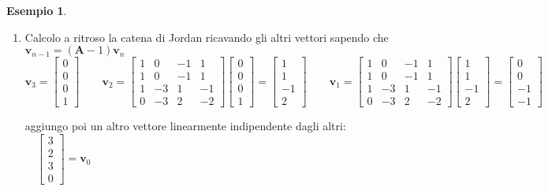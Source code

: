 \documentclass[a4paper]{article}
\renewcommand{\vec}{\bm}
\theoremstyle{definition}
\newtheorem{exmp}{Esempio}[section]
\begin{document}
\begin{exmp}
\begin{enumerate}
					\item Calcolo a ritroso la catena di Jordan ricavando gli altri vettori sapendo che $ \vec{v}_{n-1} = (\vec{A} - 1 )\vec{v}_n $
					\[
						\vec{v}_3 =
						\begin{bmatrix}
							0 \\ 0 \\ 0 \\ 1
						\end{bmatrix}
						\qquad
						\vec{v}_2 =
						\begin{bmatrix}
							1 & 0 & -1 & 1 \\
							1 & 0 & -1 & 1 \\
							1 & -3 & 1 & -1 \\
							0 & -3 & 2 & -2
						\end{bmatrix}
						\begin{bmatrix}
							0 \\ 0 \\ 0 \\ 1
						\end{bmatrix}
						=
						\begin{bmatrix}
							1 \\ 1 \\ -1 \\ 2
						\end{bmatrix}
						\qquad
						\vec{v}_1 =
						\begin{bmatrix}
						1 & 0 & -1 & 1 \\
						1 & 0 & -1 & 1 \\
						1 & -3 & 1 & -1 \\
						0 & -3 & 2 & -2
						\end{bmatrix}
						\begin{bmatrix}
							1 \\ 1 \\ -1 \\ 2
						\end{bmatrix}
						=
						\begin{bmatrix}
							0 \\ 0 \\ -1 \\ -1
						\end{bmatrix}
					\]
					
					aggiungo poi un altro vettore linearmente indipendente dagli altri:$\quad \begin{bmatrix}
					3 \\ 2 \\ 3 \\ 0
					\end{bmatrix}  = \vec{v}_0$
					

\end{enumerate}
\end{exmp}
\end{document}
